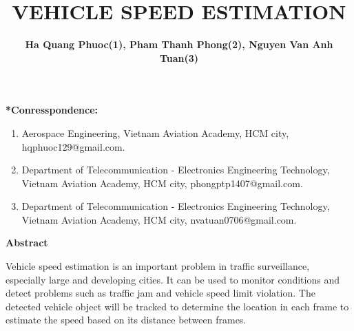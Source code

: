 \documentclass[12pt,a4paper]{article}
\begin{document}
    \title{\textbf{VEHICLE SPEED ESTIMATION}}
    \author{\textbf{Ha Quang Phuoc(1), Pham Thanh Phong(2), Nguyen Van Anh Tuan(3)}}
    \maketitle
    \textbf{*Conresspondence:}
    \begin{enumerate}
        \item Aerospace Engineering, Vietnam Aviation Academy, HCM city, hqphuoc129@gmail.com.
        \item Department of Telecommunication - Electronics Engineering Technology,
        Vietnam Aviation Academy, HCM city, phongptp1407@gmail.com.
        \item Department of Telecommunication - Electronics Engineering Technology,
        Vietnam Aviation Academy, HCM city, nvatuan0706@gmail.com.
    \end{enumerate}
    \begin{center}
        \textbf{\huge{Abstract}}
    \end{center}
        Vehicle speed estimation is an important problem in traffic surveillance, 
        especially large and developing cities. It can be used to monitor conditions 
        and detect problems such as traffic jam and vehicle speed limit violation. 
        The detected vehicle object will be tracked to determine the location in each 
        frame to estimate the speed based on its distance between frames. 
\end{document}
